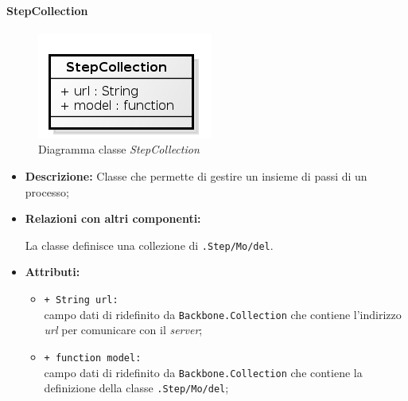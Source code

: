 \paragraph{StepCollection}
\label{stepCollection}

\begin{figure}[H] \centering \includegraphics[width=%
\textwidth]
{./classi/client/model/StepCollection.png} \caption{Diagramma classe  \textit{StepCollection}}
\end{figure}

\begin{flushleft}
\begin{itemize}
\item \textbf{Descrizione:} Classe che permette di gestire un insieme di passi di un processo;
\item \textbf{Relazioni con altri componenti:}
\begin{sloppypar}
La classe definisce una collezione di \texttt{\model{}.Step\fshyp{}Mo\fshyp{}del}.
\end{sloppypar}
\item \textbf{Attributi:}
\begin{sloppypar}
\begin{itemize}
\item \texttt{+ String url:}\\ campo dati di ridefinito da \texttt{Backbone.Collection} che contiene l'indirizzo \textit{url} per comunicare con il \textit{server};
\item \texttt{+ function model:}\\ campo dati di ridefinito da \texttt{Backbone.Collection} che contiene la definizione della classe \texttt{\model{}.Step\fshyp{}Mo\fshyp{}del};
\end{itemize}
\end{sloppypar}
\end{itemize}
\end{flushleft}